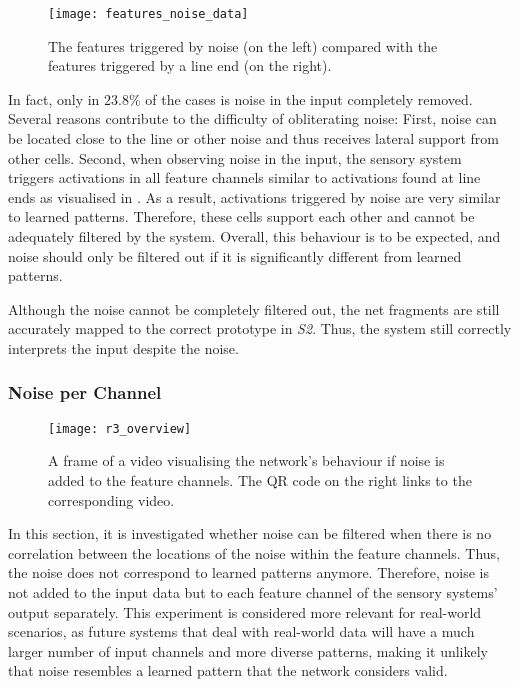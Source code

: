 \begin{figure}[h]
    \centering
    \texttt{[image: features\_noise\_data]}
    \caption[Features triggered by noise]{The features triggered by noise (on the left) compared with the features triggered by a line end (on the right).}
\end{figure}
%
In fact, only in $23.8\%$ of the cases is noise in the input completely removed.
Several reasons contribute to the difficulty of obliterating noise: First, noise can be located close to the line or other noise and thus receives lateral support from other cells. Second, when observing noise in the input, the sensory system triggers activations in all feature channels similar to activations found at line ends as visualised in .
As a result, activations triggered by noise are very similar to learned patterns. Therefore, these cells support each other and cannot be adequately filtered by the system.
Overall, this behaviour is to be expected, and noise should only be filtered out if it is significantly different from learned patterns.

Although the noise cannot be completely filtered out, the net fragments are still accurately mapped to the correct prototype in \emph{S2}. Thus, the system still correctly interprets the input despite the noise.

\subsubsection{Noise per Channel}
%
\begin{figure}[h]
    \centering
    \texttt{[image: r3\_overview]}
    \caption[Video visualising the network's behaviour with noise in the feature channels]{A frame of a video visualising the network's behaviour if noise is added to the feature channels. The QR code on the right links to the corresponding video.}
\end{figure}
%
In this section, it is investigated whether noise can be filtered when there is no correlation between the locations of the noise within the feature channels.
Thus, the noise does not correspond to learned patterns anymore.
Therefore, noise is not added to the input data but to each feature channel of the sensory systems' output separately.
This experiment is considered more relevant for real-world scenarios, as future systems that deal with real-world data will have a much larger number of input channels and more diverse patterns, making it unlikely that noise resembles a learned pattern that the network considers valid.

